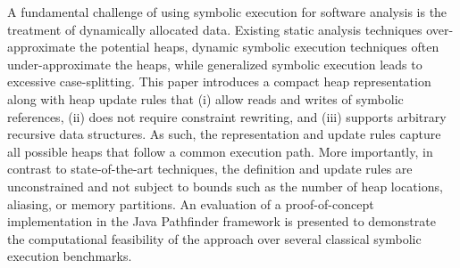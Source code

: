 A fundamental challenge of using symbolic execution for software
analysis is the treatment of dynamically allocated data. Existing
static analysis techniques over-approximate the potential heaps,
dynamic symbolic execution techniques often under-approximate the
heaps, while generalized symbolic execution leads to excessive
case-splitting. This paper introduces a compact heap representation
along with heap update rules that (i) allow reads and writes of
symbolic references, (ii) does not require constraint rewriting, and
(iii) supports arbitrary recursive data structures. As such, the
representation and update rules capture all possible heaps that follow
a common execution path. More importantly, in contrast to
state-of-the-art techniques, the definition and update rules are
unconstrained and not subject to bounds such as the number of heap
locations, aliasing, or memory partitions. An evaluation of a
proof-of-concept implementation in the Java Pathfinder framework is
presented to demonstrate the computational feasibility of the approach
over several classical symbolic execution benchmarks.
